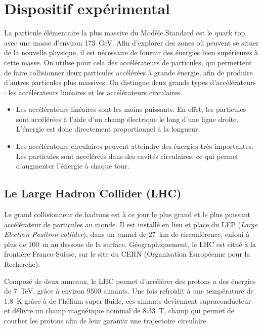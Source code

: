 \chapter{Dispositif expérimental}


La particule élémentaire la plus massive du Modèle Standard est le quark top, avec une masse d'environ \SI{173}{\GeV}. Afin d'explorer des zones où peuvent se situer de la nouvelle physique, il est nécessaire de fournir des énergies bien supérieures à cette masse. On utilise pour cela des accélérateurs de particules, qui permettent de faire collisionner deux particules accélérées à grande énergie, afin de produire d'autres particules plus massives. On distingue deux grands types d'accélérateurs : les accélérateurs linéaires et les accélérateurs circulaires.
\begin{itemize}
  \item Les accélérateurs linéaires sont les moins puissants. En effet, les particules sont accélérées à l'aide d'un champ électrique le long d'une ligne droite. L'énergie est donc directement proportionnel à la longueur.
  \item Les accélérateurs circulaires peuvent atteindre des énergies très importantes. Les particules sont accélérées dans des cavités circulaires, ce qui permet d'augmenter l'énergie à chaque tour. 
\end{itemize}

\section{Le Large Hadron Collider (LHC)}

Le grand collisionneur de hadrons est à ce jour le plus grand et le plus puissant accélérateur de particules au monde. Il est installé en lieu et place du LEP (\emph{Large Electron Positron collider}), dans un tunnel de \SI{27}{\km} de circonférence, enfoui à plus de \SI{100}{\m} au dessous de la surface. Géographiquement, le LHC est situé à la frontière Franco-Suisse, sur le site du CERN (Organisation Européenne pour la Recherche).

Composé de deux anneaux, le LHC permet d'accélérer des protons a des énergies de \SI{7}{\TeV}, grâce à environ 9500 aimants. Une fois refroidit à une température de \SI{1.8}{\K} grâce à de l'hélium super fluide, ces aimants deviennent supraconducteur et délivre un champ magnétique nominal de \SI{8.33}{\tesla}, champ qui permet de courber les protons afin de leur garantir une trajectoire circulaire.


